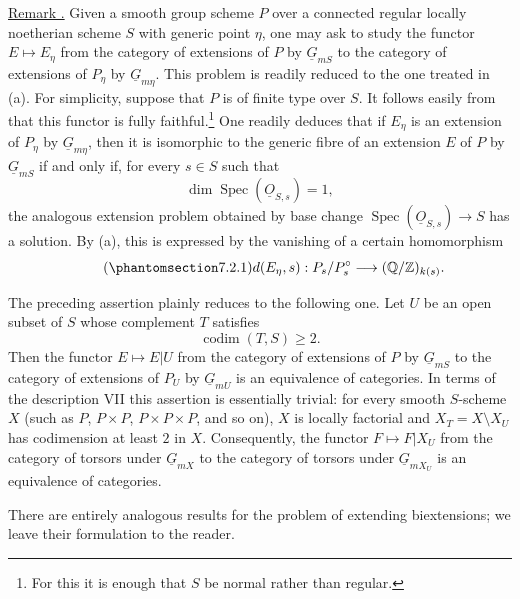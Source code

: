 
\medskip
\noindent\underline{Remark .}  Given a smooth group scheme $P$ over a
connected regular locally noetherian scheme $S$ with generic point $\eta$,
one may ask to study the functor $E\mapsto E_\eta$ from the category of
extensions of $P$ by $\underline G_{mS}$ to the category of extensions of
$P_\eta$ by $\underline G_{m\eta}$.  This problem is readily reduced to the
one treated in (a).  For simplicity, suppose that $P$ is of finite type
over $S$.  It follows easily from  that this functor is fully
faithful.\footnote{For this it is enough that $S$ be normal rather than
regular.}  One readily deduces that if $E_\eta$ is an extension of $P_\eta$
by $\underline G_{m\eta}$, then it is isomorphic to the generic fibre of an
extension $E$ of $P$ by $\underline G_{mS}$ if and only if, for every
$s\in S$ such that
\[
 \dim\operatorname{Spec}(\underline O_{S,s})=1,
\]
the analogous extension problem obtained by base change
$\operatorname{Spec}(\underline O_{S,s})\to S$ has a solution.  By (a),
this is expressed by the vanishing of a certain homomorphism
\begin{equation}\tag{\SGARefTarget{sga7.sga7i.eviii.n7-2-1}{7.2.1}}
 d(E_\eta,s):P_s/P_s^{\circ}
 \longrightarrow(\mathbb Q/\mathbb Z)_{k(s)}.
\end{equation}

The preceding assertion plainly reduces to the following one.  Let $U$ be
an open subset of $S$ whose complement $T$ satisfies
\[
 \operatorname{codim}(T,S)\geq2.
\]
Then the functor $E\mapsto E|U$ from the category of extensions of $P$ by
$\underline G_{mS}$ to the category of extensions of $P_U$ by
$\underline G_{mU}$ is an equivalence of categories.  In terms of the
description VII  this assertion is essentially trivial: for every
smooth $S$-scheme $X$ (such as $P$, $P\times P$,
$P\times P\times P$, and so on), $X$ is locally factorial and
$X_T=X\setminus X_U$ has codimension at least $2$ in $X$.  Consequently,
the functor $F\mapsto F|X_U$ from the category of torsors under
$\underline G_{mX}$ to the category of torsors under
$\underline G_{mX_U}$ is an equivalence of categories.

There are entirely analogous results for the problem of extending
biextensions; we leave their formulation to the reader.

